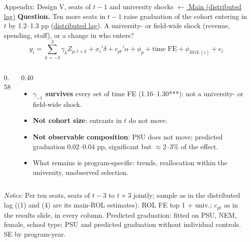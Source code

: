 \documentclass{beamer}
\begin{document}
\begin{frame}[label=d5-tm1-uniyear]{Appendix: Design V, seats of $t-1$ and university shocks}
\hyperlink{d5-leadlag-joint}{\tiny\color{blue}$\leftarrow$ Main (distributed lag)}
\scriptsize
\textbf{Question.} Ten more seats in $t-1$ raise graduation of the cohort entering in $t$ by 1.2--1.3 pp (\hyperlink{d5-leadlag-joint}{\color{blue}distributed lag}). A university- or field-wide shock (revenue, spending, staff), or a change in who enters?
\vspace{-0.2cm}
\[
y_i = \textstyle\sum_{k=-3}^{3} \gamma_k Z_{p,t+k} + x_i'\delta + c_{pt}'\alpha + \phi_p + \text{time FE} + \phi_{ROL(i)} + e_i
\]
\vspace{-0.35cm}
\begin{columns}[T,onlytextwidth]
\begin{column}{0.58\textwidth}
\centering
\tiny
\resizebox{\linewidth}{!}{}
\end{column}
\begin{column}{0.40\textwidth}
\scriptsize
\begin{itemize}
    \setlength{\itemsep}{2pt}
    \item \textbf{$\gamma_{-1}$ survives} every set of time FE (1.16--1.30***): not a university- or field-wide shock.
    \item \textbf{Not cohort size}: entrants in $t$ do not move.
    \item \textbf{Not observable composition}: PSU does not move; predicted graduation 0.02--0.04 pp, significant but $\approx$2--3\% of the effect.
    \item What remains is program-specific: trends, reallocation within the university, unobserved selection.
\end{itemize}
\end{column}
\end{columns}

\vspace{0.05cm}
\parbox{0.97\textwidth}{\tiny \textit{Notes:} Per ten seats, seats of $t-3$ to $t+3$ jointly; sample as in the distributed lag ((1) and (4) are its main-ROL estimates). ROL FE top 1 + univ.; $c_{pt}$ as in the results slide, in every column. Predicted graduation: fitted on PSU, NEM, female, school type; PSU and predicted graduation without individual controls. SE by program-year.}
\end{frame}
\end{document}
